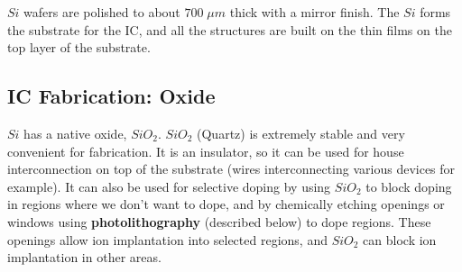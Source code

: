 $Si$ wafers are polished to about $700\;\mu m$ thick with a mirror finish.  The $Si$ forms the substrate for the IC, and all the structures are built on the thin films on the top layer of the substrate.  
\subsection{IC Fabrication: Oxide}
$Si$ has a native oxide, $SiO_2$.  $SiO_2$ (Quartz) is extremely stable and very convenient for fabrication.  It is an insulator, so it can be used for house interconnection on top of the substrate (wires interconnecting various devices for example).  It can also be used for selective doping by using $SiO_2$ to block doping in regions where we don't want to dope, and by chemically etching openings or windows using \textbf{photolithography} (described below) to dope regions.  These openings allow ion implantation into selected regions, and $SiO_2$ can block ion implantation in other areas.
